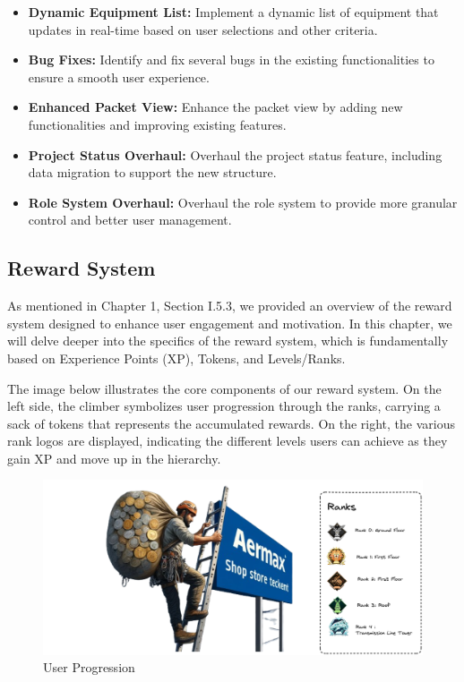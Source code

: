 \begin{itemize}
    \item \textbf{Dynamic Equipment List:} Implement a dynamic list of equipment that updates in real-time based on user selections and other criteria.
    \item \textbf{Bug Fixes:} Identify and fix several bugs in the existing functionalities to ensure a smooth user experience.
    \item \textbf{Enhanced Packet View:} Enhance the packet view by adding new functionalities and improving existing features.
    \item \textbf{Project Status Overhaul:} Overhaul the project status feature, including data migration to support the new structure.
    \item \textbf{Role System Overhaul:} Overhaul the role system to provide more granular control and better user management.
\end{itemize}

\subsection{Reward System}
As mentioned in Chapter 1, Section I.5.3, we provided an overview of the reward system designed to enhance user engagement and motivation. In this chapter, we will delve deeper into the specifics of the reward system, which is fundamentally based on Experience Points (XP), Tokens, and Levels/Ranks.

The image below illustrates the core components of our reward system. On the left side, the climber symbolizes user progression through the ranks, carrying a sack of tokens that represents the accumulated rewards. On the right, the various rank logos are displayed, indicating the different levels users can achieve as they gain XP and move up in the hierarchy.
\begin{figure}[H]
    \centering
    \includegraphics[width=\textwidth]{src/assets/images/AermaxClimberPng.png}
    \caption{User Progression}
    \label{fig:user_progression}
\end{figure}

